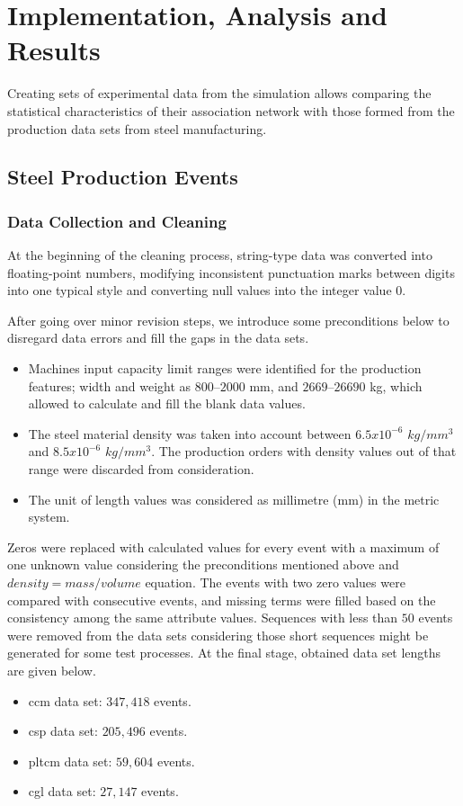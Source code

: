 \chapter{Implementation, Analysis and Results}\label{implementation_analysis}
{\color{red}Creating sets of experimental data from the simulation allows comparing the statistical characteristics of their association network with those formed from the production data sets from steel manufacturing.}
\section{Steel Production Events}
\subsection{Data Collection and Cleaning}\label{data_collection_cleaning}

At the beginning of the cleaning process, string-type data was converted into floating-point numbers, modifying inconsistent punctuation marks between digits into one typical style and converting null values into the integer value $0$. 

After going over minor revision steps, we introduce some preconditions below to disregard data errors and fill the gaps in the data sets.
\begin{itemize}
	\item Machines input capacity limit ranges were identified for the production features; width and weight as $800$--$2000$ mm, and $2669$--$26690$ kg, which allowed to calculate and fill the blank data values. 
	\item The steel material density was taken into account between $6.5 x 10^{-6}$ $kg/mm^{3}$ and $8.5 x 10^{-6}$ $kg/mm^{3}$. The production orders with density values out of that range were discarded from consideration.
	\item The unit of length values was considered as millimetre (mm) in the metric system.
\end{itemize}

Zeros were replaced with calculated values for every event with a maximum of one unknown value considering the preconditions mentioned above and $density = mass/volume$ equation. The events with two zero values were compared with consecutive events, and missing terms were filled based on the consistency among the same attribute values. Sequences with less than $50$ events were removed from the data sets considering those short sequences might be generated for some test processes. At the final stage, obtained data set lengths are given below.
\begin{itemize}
	\item \acs{ccm} data set: $347,418$ events.
	\item \acs{csp} data set: $205,496$ events.
	\item \acs{pltcm} data set: $59,604$ events.
	\item \acs{cgl} data set: $27,147$ events.
\end{itemize}

